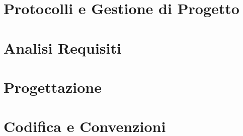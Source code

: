 \newpage
\section{Protocolli e Gestione di Progetto}


\newpage
\section{Analisi Requisiti}


\newpage
\section{Progettazione}

\newpage
\section{Codifica e Convenzioni}






